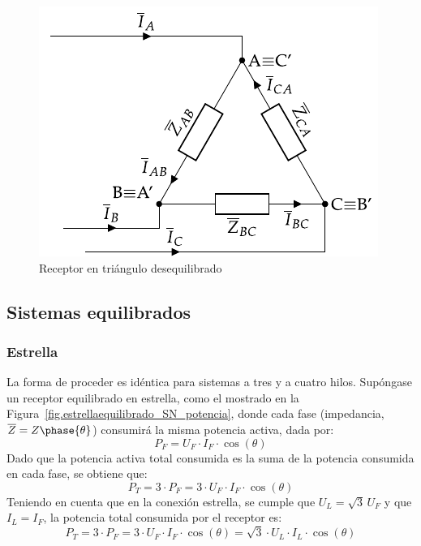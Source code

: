 	\begin{figure}
	    \centering
	    \includegraphics{../figs/trianguloDesequilibrado_receptor.pdf}
	    \caption{Receptor en triángulo desequilibrado}
	    \label{fig.trianguloDesequilibrado_receptor_potencia}
	\end{figure}
	
	\subsection{Sistemas equilibrados}
	
	\subsubsection{Estrella}
	
	La forma de proceder es idéntica para sistemas a tres y a cuatro hilos. Supóngase un receptor equilibrado en estrella, como el mostrado en la Figura~\ref{fig.estrellaequilibrado_SN_potencia}, donde cada fase (impedancia, $\overline{Z}=Z\phase{\theta}$) consumirá la misma potencia activa, dada por: 
	\begin{equation*}
	    P_F=U_{F}\cdot I_F \cdot \cos(\theta)
	\end{equation*}
	Dado que la potencia activa total consumida es la suma de la potencia consumida en cada fase, se obtiene que:
	\begin{equation*}
	    P_T=3\cdot P_F=3\cdot U_F\cdot I_F\cdot\cos(\theta)
	\end{equation*}
	Teniendo en cuenta que en la conexión estrella, se cumple que $U_L=\sqrt{3}\,U_F$ y que $I_L=I_F$, la potencia total consumida por el receptor es: 
	\begin{equation}
	    \boxed{P_T=3\cdot P_F=3\cdot U_F\cdot {I_F}\cdot\cos(\theta)=\sqrt{3}\cdot U_L\cdot I_L\cdot\cos(\theta)}
	\end{equation}
	
